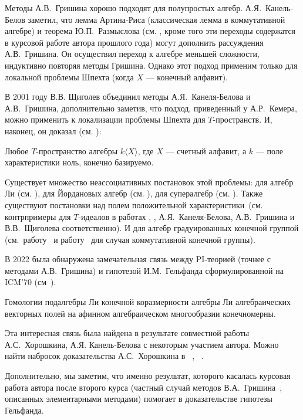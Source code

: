 Методы А.В.\ Гришина хорошо подходят для полупростых алгебр.
А.Я.\ Канель-Белов заметил, что лемма Артина-Риса (классическая лемма в коммутативной алгебре) и теорема Ю.П.\ Размыслова (см. \cite{GrishinSchigolev}, кроме того эти переходы содержатся в курсовой работе автора прошлого года) могут дополнить рассуждения А.В.\ Гришина.
Он осуществил переход к алгебре меньшей сложности, индуктивно повторяя методы Гришина.
Однако этот подход применим только для локальной проблемы Шпехта (когда $X$ — конечный алфавит).

В 2001 году В.В. Щиголев объединил методы А.Я.\ Канеля-Белова и А.В.\ Гришина, дополнительно заметив, что подход, приведенный у А.Р.\ Кемера, можно применить к локализации проблемы Шпехта для $T$-пространств.
И, наконец, он доказал (см. \cite{Shchigolev}):
\vskip 0.1in\noindent
\begin{theorem*} [В.В. Щиголев, 2001]
    Любое $T$-пространство алгебры $k\langle X\rangle$, где $X$ — счетный алфавит, а $k$ — поле характеристики ноль, конечно базируемо.
\end{theorem*}
\vskip 0.1in\noindent

Существует множество неассоциативных постановок этой проблемы: для алгебр Ли (см. \cite{Lie}), для Йордановых алгебр (см. \cite{Jordan}), для супералгебр (см. \cite{Super}).
Также существуют постановки над полем положительной характеристики\ (см. контрпримеры для $T$-идеалов в работах \cite{ConterKanel}, \cite{ConterGrishin}, \cite{ConterShchigolev} А.Я.\ Канеля-Белова, А.В.\ Гришина и В.В.\ Щиголева соответственно).
И для алгебр градуированных конечной группой (см.\ работу~\cite{GradedKanel} и работу~\cite{GradedSviridova} для случая коммутативной конечной группы).

В 2022 была обнаружена замечательная связь между PI-теорией (точнее с методами А.В.\ Гришина) и гипотезой И.М.\ Гельфанда сформулированной на ICM’70 (см\ \cite{Gelfand}).
\vskip 0.1in\noindent
\begin{conjecture}[И.М.\ Гельфанд, 1970]
    \label{Gelfand}
    Гомологии подалгебры Ли конечной коразмерности алгебры Ли алгебраических векторных полей на афинном алгебраическом многообразии конечномерны.
\end{conjecture}
\vskip 0.1in\noindent
Эта интересная связь была найдена в результате совместной работы А.С.\ Хорошкина, А.Я. Канель-Белова с некоторым участием автора.
Можно найти набросок доказательства А.С.\ Хорошкина в ~\cite{Feigin-Kanel-Khoroshkin}, ~\cite{Centrone-Kanel-Khoroshkin-Vorobiov}.

Дополнительно, мы заметим, что именно результат, которого касалась курсовая работа автора после второго курса (частный случай методов В.А.\ Гришина~\cite{Grishin}, описанных элементарными методами) помогает в доказательстве гипотезы Гельфанда.